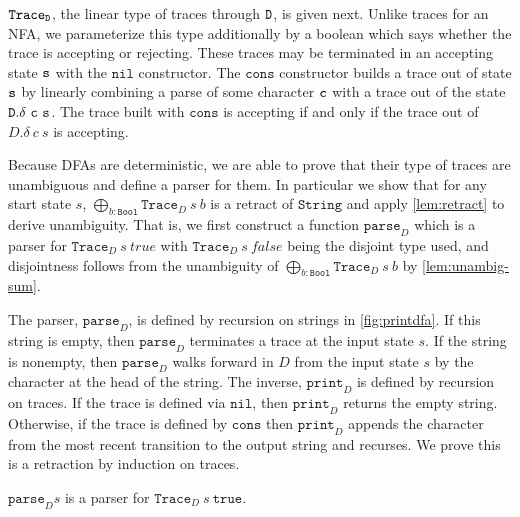 \documentclass[acmsmall,nonacm]{acmart}
\newcommand{\StringGram}{\texttt{String}}
\newcommand{\Bool}{\mathtt{Bool}}
\newcommand{\true}{\mathtt{true}}
\newcommand{\nil}{\texttt{nil}}
\newcommand{\cons}{\texttt{cons}}
\newcommand{\Trace}{\texttt{Trace}}
\newcommand{\LinSigTy}[3]{\textstyle\bigoplus_{#1 : #2} #3}
\newcommand{\agdalogo}{%
  \usebox{\logoagdabox}}%
\newcommand{\zenodolink}{https://zenodo.org/records/15049780}
\newcommand{\Agda}{\href{\zenodolink}{\agdalogo}}
\newcommand{\pparse}{\mathtt{parse}}
\newcommand{\print}{\mathtt{print}}
\begin{document}
{$\Trace_{\D}$, the linear type of traces through $\texttt{D}$, is given
next. Unlike traces for an NFA, we parameterize this type additionally
by a boolean which says whether the trace is accepting or
rejecting. These traces may be terminated in an accepting state $\texttt{s}$
with the $\nil$ constructor.  The $\cons$ constructor builds a trace
out of state $\texttt{s}$ by linearly combining a parse of some character $\texttt{c}$
with a trace out of the state $\texttt{D}.\delta~\texttt{c}~\texttt{s}$. The trace built with
$\cons$ is accepting if and only if the trace out of $D.\delta~c~s$ is
accepting.

Because DFAs are deterministic, we are able to prove that their type
of traces are unambiguous and define a parser for them. In particular
we show that for any start state $s$, ${\LinSigTy {b} {\Bool}
  \Trace_{D}~s~b}$ is a retract of $\StringGram$ and apply \cref{lem:retract} to
derive unambiguity. That is, we first
construct a function $\pparse_{D}$ which is a parser for
$\Trace_D~{s}~{true}$ with $\Trace_D~{s}~{false}$ being the disjoint
type used, and disjointness follows from the
unambiguity of $\LinSigTy {b} {\Bool} {\Trace_{D}~s~b}$ by \cref{lem:unambig-sum}.

The parser,
$\pparse_{D}$,
is defined by recursion on strings in \cref{fig:printdfa}. If this string is empty, then $\pparse_{D}$
terminates a trace at the input state $s$. If the
string is nonempty, then $\pparse_{D}$ walks forward in $D$ from the input state $s$ by
the character at the head of the string.
%
The inverse, $\print_{D}$ is defined by recursion on traces. If the trace is defined
via $\nil$, then $\print_{D}$ returns the empty string. Otherwise, if the trace
is defined by $\cons$ then $\print_{D}$ appends the character from the most
recent transition to the output
string and recurses.
%
We prove this is a retraction by induction on traces.

\begin{theorem}[\Agda]
  \label{thm:dfa-parser}
  $\pparse_D s$ is a parser for $\Trace_D~s~\true$.
\end{theorem}

}
\end{document}
